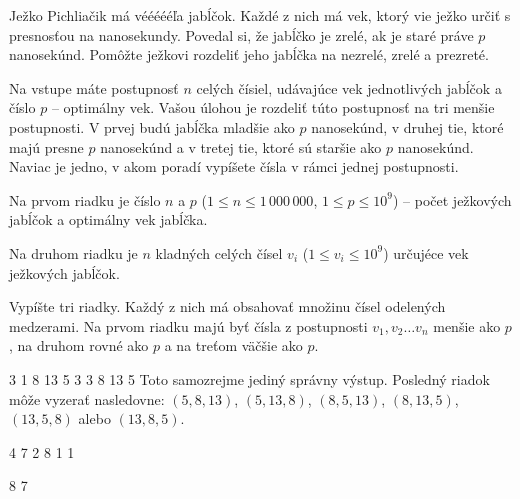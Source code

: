 




Ježko Pichliačik má véééééľa jabĺčok. Každé z nich má vek, ktorý vie ježko určiť s presnosťou na
nanosekundy. Povedal si, že jabĺčko je zrelé, ak je staré práve $p$ nanosekúnd. Pomôžte ježkovi
rozdeliť jeho jabĺčka na nezrelé, zrelé a prezreté.


Na vstupe máte postupnosť $n$ celých čísiel, udávajúce vek jednotlivých jabĺčok a číslo $p$ --
optimálny vek. Vašou úlohou je rozdeliť túto postupnosť na tri menšie postupnosti. V prvej budú
jabĺčka mladšie ako $p$ nanosekúnd, v druhej tie, ktoré majú presne $p$ nanosekúnd a v tretej tie, ktoré sú
staršie ako $p$ nanosekúnd. Naviac je jedno, v akom poradí vypíšete čísla v rámci jednej
postupnosti.


Na prvom riadku je číslo $n$ a $p$ ($1 \leq n \leq 1\,000\,000$, $1\leq p\leq 10^9$) -- počet
ježkových jabĺčok a optimálny vek jabĺčka.

Na druhom riadku je $n$ kladných celých čísel $v_i$ ($1 \leq v_i \leq 10^9$) určujéce vek ježkových
jabĺčok.


Vypíšte tri riadky. Každý z nich má obsahovať množinu čísel odelených medzerami. Na prvom riadku
majú byť čísla z postupnosti $v_1, v_2 \dots v_n$ menšie ako $p$, na druhom rovné ako $p$ a na
treťom väčšie ako $p$.


 3
1 8 13 5 3
3
8 13 5
\komentar
Toto samozrejme jediný správny výstup. Posledný riadok môže vyzerať nasledovne: $(5, 8, 13)$, $(5,
13, 8)$, $(8, 5, 13)$, $(8, 13, 5)$, $(13, 5, 8)$ alebo $(13, 8, 5)$. 
\koniec

 4
7 2 8 1
 1

8 7
\koniec


